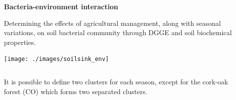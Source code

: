\documentclass[10pt]{beamer}
\begin{document}
\ifsseek
\begin{frame}
	\textbf{\Large{Bacteria-environment interaction}}
	\begin{block}{}
		Determining the effects of agricultural management, along with seasonal variations, on soil bacterial community through DGGE and soil biochemical properties.
	\end{block}
	\begin{center}
		\texttt{[image: ./images/soilsink\_env]}	
	\end{center}
	\begin{columns}
		\begin{column}{0.5\textwidth}
			It is possible to define two clusters for each season, except for the cork-oak forest (CO) which forms two separated clusters.
		\end{column}
		\begin{column}{0.5\textwidth}
		\end{column}
	\end{columns}
\end{frame}
\fi
\end{document}
